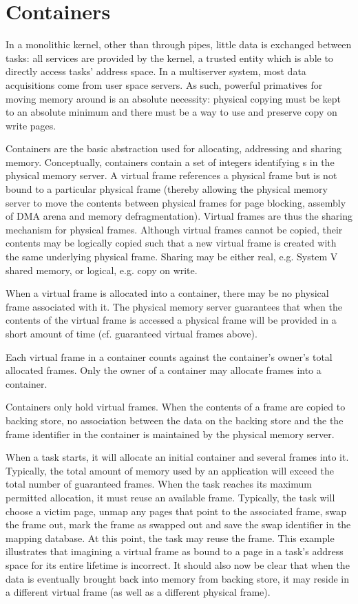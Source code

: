 \section{Containers}

In a monolithic kernel, other than through pipes, little data is
exchanged between tasks: all services are provided by the kernel, a
trusted entity which is able to directly access tasks' address space.
In a multiserver system, most data acquisitions come from user space
servers.  As such, powerful primatives for moving memory around is an
absolute necessity: physical copying must be kept to an absolute
minimum and there must be a way to use and preserve copy on write
pages.

Containers are the basic abstraction used for allocating, addressing
and sharing memory.  Conceptually, containers contain a set of
integers identifying s in the physical memory
server.  A virtual frame references a physical frame but is not bound
to a particular physical frame (thereby allowing the physical memory
server to move the contents between physical frames for page blocking,
assembly of DMA arena and memory defragmentation).  Virtual frames are
thus the sharing mechanism for physical frames.  Although virtual
frames cannot be copied, their contents may be logically copied such
that a new virtual frame is created with the same underlying physical
frame.  Sharing may be either real, e.g. System V shared memory, or
logical, e.g. copy on write.

When a virtual frame is allocated into a container, there may be no
physical frame associated with it.  The physical memory server
guarantees that when the contents of the virtual frame is accessed a
physical frame will be provided in a short amount of time
(cf. guaranteed virtual frames above).

Each virtual frame in a container counts against the container's
owner's total allocated frames.  Only the owner of a container may
allocate frames into a container.

Containers only hold virtual frames.  When the contents of a frame are
copied to backing store, no association between the data on the
backing store and the the frame identifier in the container is
maintained by the physical memory server.

When a task starts, it will allocate an initial container and several
frames into it.  Typically, the total amount of memory used by an
application will exceed the total number of guaranteed frames.  When
the task reaches its maximum permitted allocation, it must reuse an
available frame.  Typically, the task will choose a victim page, unmap
any pages that point to the associated frame, swap the frame out, mark
the frame as swapped out and save the swap identifier in the mapping
database.  At this point, the task may reuse the frame.  This example
illustrates that imagining a virtual frame as bound to a page in a
task's address space for its entire lifetime is incorrect.  It should
also now be clear that when the data is eventually brought back into
memory from backing store, it may reside in a different virtual frame
(as well as a different physical frame).

